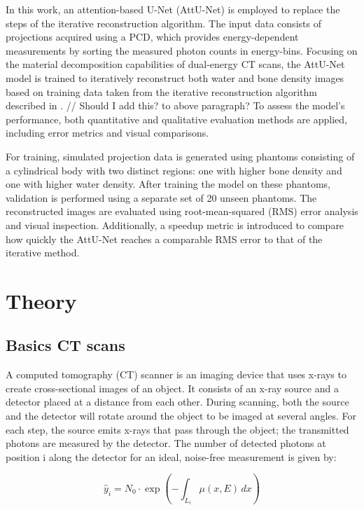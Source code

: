 \documentclass{article}
\begin{document}
In this work, an attention-based U-Net (AttU-Net) is employed to replace the steps of the iterative reconstruction algorithm. The input data consists of projections acquired using a PCD, which provides energy-dependent measurements by sorting the measured photon counts in energy-bins. Focusing on the material decomposition capabilities of dual-energy CT scans, the AttU-Net model is trained to iteratively reconstruct both water and bone density images based on training data taken from the iterative reconstruction algorithm described in \citep{mechlem2018joint}.
// Should I add this? to above paragraph? To assess the model's performance, both quantitative and qualitative evaluation methods are applied, including error metrics and visual comparisons.

For training, simulated projection data is generated using phantoms consisting of a cylindrical body with two distinct regions: one with higher bone density and one with higher water density. After training the model on these phantoms, validation is performed using a separate set of 20 unseen phantoms. The reconstructed images are evaluated using root-mean-squared (RMS) error analysis and visual inspection. Additionally, a speedup metric is introduced to compare how quickly the AttU-Net reaches a comparable RMS error to that of the iterative method.

\section{Theory}

\subsection{Basics CT scans}

A computed tomography (CT) scanner is an imaging device that uses x-rays to create cross-sectional images of an object. It consists of an x-ray source and a detector placed at a distance from each other. During scanning, both the source and the detector will rotate around the object to be imaged at several angles. For each step, the source emits x-rays that pass through the object; the transmitted photons are measured by the detector. The number of detected photons at position i along the detector for an ideal, noise-free measurement is given by:

\begin{equation}
\label{first }
\hat{y}_i  = N_0 \cdot \exp\left(-\int_{L_i} \mu(x, E) \, dx\right)
\end{equation}
\end{document}
